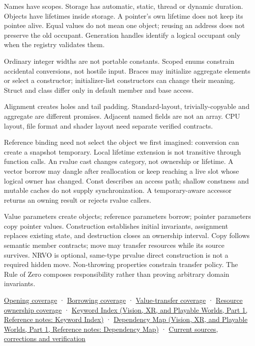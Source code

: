 Names have scopes. Storage has automatic, static, thread or dynamic duration. Objects have lifetimes inside storage. A pointer's own lifetime does not keep its pointee alive. Equal values do not mean one object; reusing an address does not preserve the old occupant. Generation handles identify a logical occupant only when the registry validates them.

Ordinary integer widths are not portable constants. Scoped enums constrain accidental conversions, not hostile input. Braces may initialize aggregate elements or select a constructor; initializer-list constructors can change their meaning. Struct and class differ only in default member and base access.

Alignment creates holes and tail padding. Standard-layout, trivially-copyable and aggregate are different promises. Adjacent named fields are not an array. CPU layout, file format and shader layout need separate verified contracts.

Reference binding need not select the object we first imagined: conversion can create a snapshot temporary. Local lifetime extension is not transitive through function calls. An rvalue cast changes category, not ownership or lifetime. A vector borrow may dangle after reallocation or keep reaching a live slot whose logical owner has changed. Const describes an access path; shallow constness and mutable caches do not supply synchronization. A temporary-aware accessor returns an owning result or rejects rvalue callers.

Value parameters create objects; reference parameters borrow; pointer parameters copy pointer values. Construction establishes initial invariants, assignment replaces existing state, and destruction closes an ownership interval. Copy follows semantic member contracts; move may transfer resources while its source survives. NRVO is optional, same-type prvalue direct construction is not a required hidden move. Non-throwing properties constrain transfer policy. The Rule of Zero composes responsibility rather than proving arbitrary domain invariants.

\hyperref[appendix-fd090d982a15-m007---parts-101-112]{Opening coverage} · \hyperref[appendix-fd090d982a15-m008---parts-113-126]{Borrowing coverage} · \hyperref[appendix-fd090d982a15-m009---parts-127-147]{Value-transfer coverage} · \hyperref[appendix-fd090d982a15-m010---parts-148-160]{Resource ownership coverage} · \href{../07-Vision-XR-and-Playable-Worlds-P01/main.pdf\#nameddest=appendix-a6d556a4ef50}{Keyword Index (Vision, XR, and Playable Worlds, Part 1, Reference notes: Keyword Index)} · \href{../07-Vision-XR-and-Playable-Worlds-P01/main.pdf\#nameddest=appendix-4ad47bdd269a}{Dependency Map (Vision, XR, and Playable Worlds, Part 1, Reference notes: Dependency Map)} · \hyperref[appendix-a103e7846d21-m010---resource-ownership]{Current sources, corrections and verification}

